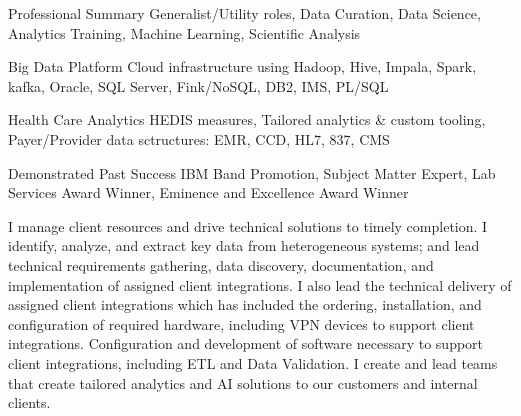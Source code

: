 

\begin{cvskills}

  \cvskill
    {Professional Summary} %
    {Generalist/Utility roles, Data Curation, Data Science, Analytics Training, Machine Learning, Scientific Analysis} %

  \cvskill
    {Big Data Platform} %
    {Cloud infrastructure using Hadoop, Hive, Impala, Spark, kafka, Oracle, SQL Server, Fink/NoSQL, DB2, IMS, PL/SQL} %

  \cvskill
    {Health Care Analytics} %
    {HEDIS measures, Tailored analytics \& custom tooling, Payer/Provider data sctructures: EMR, CCD, HL7, 837, CMS} %

  \cvskill
    {Demonstrated Past Success} %
    {IBM Band Promotion, Subject Matter Expert, Lab Services Award Winner, Eminence and Excellence Award Winner} %

\end{cvskills}

\begin{cvparagraph}
  I manage client resources and drive technical solutions to timely completion.  I identify, analyze, and extract key data from heterogeneous systems; and lead technical requirements gathering, data discovery, documentation, and implementation of assigned client integrations.  I also lead the technical delivery of assigned client integrations which has included the ordering, installation, and configuration of required hardware, including VPN devices to support client integrations.  Configuration and development of software necessary to support client integrations, including ETL and Data Validation.  I create and lead teams that create tailored analytics and AI solutions to our customers and internal clients.
\end{cvparagraph}
    

